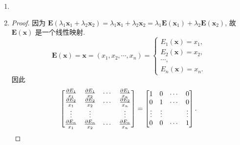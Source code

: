 \documentclass[a4paper, 11pt]{ctexart}
\begin{document}
\begin{enumerate}
\begin{enumerate}[(1)]
\begin{proof}
                    \begin{align*}
                        \boldsymbol{f}(\boldsymbol{x}) &= \boldsymbol{f}(x_1, x_2, \cdots, x_n) \\
                        &= \boldsymbol{f}(x_1\boldsymbol{e}_1 + x_2\boldsymbol{e}_2 + \cdots + x_n\boldsymbol{e}_n) \\
                        &= x_1\boldsymbol{f}(\boldsymbol{e}_1) + \boldsymbol{f}(x_2\boldsymbol{e}_2 + \cdots + x_n\boldsymbol{e}_n) \\
                        &= x_1\boldsymbol{f}(\boldsymbol{e}_1) + x_2\boldsymbol{f}(\boldsymbol{e}_2) + \cdots + x_n\boldsymbol{f}(\boldsymbol{e}_n). \qedhere
                    \end{align*}
                \end{proof}
        \end{enumerate}
    \item %
    \item %
        \begin{proof}
            因为 $\boldsymbol{E}(\lambda_1\boldsymbol{x}_1 + \lambda_2\boldsymbol{x}_2) = \lambda_1\boldsymbol{x}_1 + \lambda_2\boldsymbol{x}_2 = \lambda_1\boldsymbol{E}(\boldsymbol{x}_1) + \lambda_2\boldsymbol{E}(\boldsymbol{x}_2)$, 故 $\boldsymbol{E}(\boldsymbol{x})$ 是一个线性映射.
            \[
                \boldsymbol{E}(\boldsymbol{x}) = \boldsymbol{x} = (x_1, x_2, \cdots, x_n) =
                \begin{cases}
                    E_1(\boldsymbol{x}) = x_1, \\
                    E_2(\boldsymbol{x}) = x_2, \\
                    \cdots, \\
                    E_n(\boldsymbol{x}) = x_n.
                \end{cases}    
            \]
            因此
            \[
                \begin{bmatrix}
                    \frac{\partial{E_1}}{x_1} & \frac{\partial{E_1}}{x_2} & \cdots & \frac{\partial{E_1}}{x_n} \\ 
                    \frac{\partial{E_2}}{x_1} & \frac{\partial{E_2}}{x_2} & \cdots & \frac{\partial{E_2}}{x_n} \\
                    \vdots & \vdots &  & \vdots \\ 
                    \frac{\partial{E_n}}{x_1} & \frac{\partial{E_n}}{x_2} & \cdots & \frac{\partial{E_n}}{x_n} \\ 
                \end{bmatrix}
                =
                \begin{bmatrix}
                    1 & 0 & \cdots & 0 \\
                    0 & 1 & \cdots & 0 \\
                    \vdots & \vdots & & \vdots \\
                    0 & 0 & \cdots & 1
                \end{bmatrix}. \qedhere    
            \]
        \end{proof}
\end{enumerate}
\end{document}
